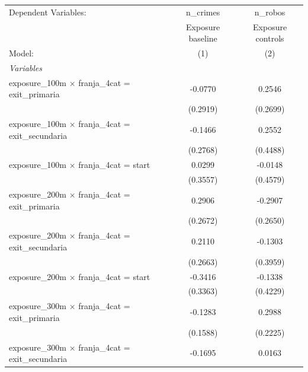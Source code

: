 
\begingroup
\centering
\tiny
\begin{tabular}{lcc}
   \tabularnewline \midrule \midrule
   Dependent Variables:                                        & n\_crimes         & n\_robos\\   
                                                               & Exposure baseline & Exposure controls \\   
   Model:                                                      & (1)               & (2)\\  
   \midrule
   \emph{Variables}\\
   exposure\_100m $\times$ franja\_4cat = exit\_primaria       & -0.0770           & 0.2546\\   
                                                               & (0.2919)          & (0.2699)\\   
   exposure\_100m $\times$ franja\_4cat = exit\_secundaria     & -0.1466           & 0.2552\\   
                                                               & (0.2768)          & (0.4488)\\   
   exposure\_100m $\times$ franja\_4cat = start                & 0.0299            & -0.0148\\   
                                                               & (0.3557)          & (0.4579)\\   
   exposure\_200m $\times$ franja\_4cat = exit\_primaria       & 0.2906            & -0.2907\\   
                                                               & (0.2672)          & (0.2650)\\   
   exposure\_200m $\times$ franja\_4cat = exit\_secundaria     & 0.2110            & -0.1303\\   
                                                               & (0.2663)          & (0.3959)\\   
   exposure\_200m $\times$ franja\_4cat = start                & -0.3416           & -0.1338\\   
                                                               & (0.3363)          & (0.4229)\\   
   exposure\_300m $\times$ franja\_4cat = exit\_primaria       & -0.1283           & 0.2988\\   
                                                               & (0.1588)          & (0.2225)\\   
   exposure\_300m $\times$ franja\_4cat = exit\_secundaria     & -0.1695           & 0.0163\\   

\end{tabular}
